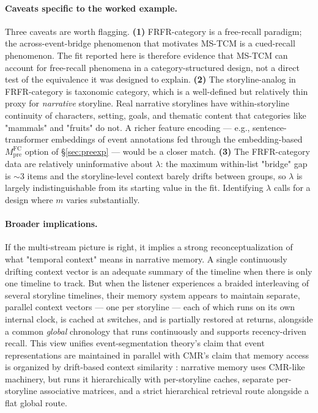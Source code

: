 \documentclass[10pt]{article}
\newcommand{\MFCpre}{M^{\mathrm{FC}}_{\mathrm{pre}}}
\begin{document}
\paragraph{Caveats specific to the worked example.}
Three caveats are worth flagging. \textbf{(1)} FRFR-category is a
free-recall paradigm; the across-event-bridge phenomenon that
motivates MS-TCM is a cued-recall phenomenon. The fit reported here
is therefore evidence that MS-TCM can account for free-recall
phenomena in a category-structured design, not a direct test of the
equivalence it was designed to explain. \textbf{(2)} The
storyline-analog in FRFR-category is taxonomic category, which is a
well-defined but relatively thin proxy for \emph{narrative} storyline.
Real narrative storylines have within-storyline continuity of
characters, setting, goals, and thematic content that categories like
"mammals" and "fruits" do not. A richer feature encoding --- e.g.,
sentence-transformer embeddings of event annotations fed through the
embedding-based $\MFCpre$ option of \S\ref{sec:preexp} --- would be a
closer match. \textbf{(3)} The FRFR-category data are relatively
uninformative about $\lambda$: the maximum within-list "bridge" gap
is $\sim 3$ items and the storyline-level context barely drifts
between groups, so $\lambda$ is largely indistinguishable from its
starting value in the fit. Identifying $\lambda$ calls for a design
where $m$ varies substantially.

\paragraph{Broader implications.}
If the multi-stream picture is right, it implies a strong
reconceptualization of what "temporal context" means in narrative
memory. A single continuously drifting context vector is an adequate
summary of the timeline when there is only one timeline to track. But
when the listener experiences a braided interleaving of several
storyline timelines, their memory system appears to maintain
separate, parallel context vectors --- one per storyline --- each of
which runs on its own internal clock, is cached at switches, and is
partially restored at returns, alongside a common \emph{global}
chronology that runs continuously and supports recency-driven recall.
This view unifies event-segmentation theory's claim that event
representations are maintained in parallel \citep{ZacSpeSwaBraRey07}
with CMR's claim that memory access is organized by drift-based
context similarity \citep{PolyEtal09,CornellZhang2025}: narrative
memory uses CMR-like machinery, but runs it hierarchically with
per-storyline caches, separate per-storyline associative matrices,
and a strict hierarchical retrieval route alongside a flat global
route.
\end{document}

